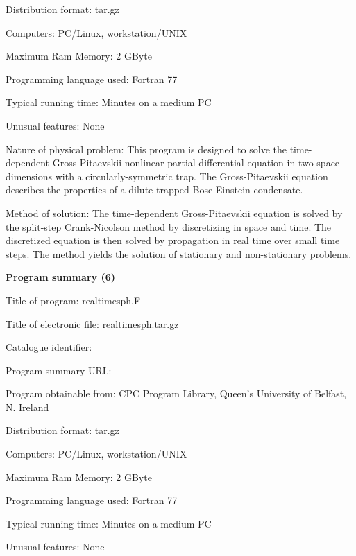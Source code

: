 \documentclass[onecolumn]{elsart3p}
\begin{document}
Distribution format: tar.gz

Computers: PC/Linux, workstation/UNIX

Maximum Ram Memory: 2 GByte

Programming language used: Fortran 77




Typical running time: Minutes on a medium PC

Unusual features: None

Nature of physical problem: This program is designed to solve the
time-dependent Gross-Pitaevskii nonlinear partial differential equation
in two space dimensions with a circularly-symmetric trap. The
Gross-Pitaevskii equation describes the properties of a dilute trapped
Bose-Einstein condensate.


Method of solution: The time-dependent Gross-Pitaevskii equation is 
solved by the split-step Crank-Nicolson method by discretizing in space 
and time. The discretized equation is then solved by propagation in 
real time over small time steps.  The method yields the solution of 
stationary and non-stationary problems.  


{\bf Program summary (6)}

Title of program: realtimesph.F

Title of electronic file: realtimesph.tar.gz

Catalogue identifier:

Program summary URL: 

Program obtainable from: CPC Program Library, Queen's University of 
Belfast, N. Ireland

Distribution format: tar.gz

Computers: PC/Linux, workstation/UNIX

Maximum Ram Memory: 2 GByte

Programming language used: Fortran 77




Typical running time: Minutes on a medium PC

Unusual features: None
\end{document}
